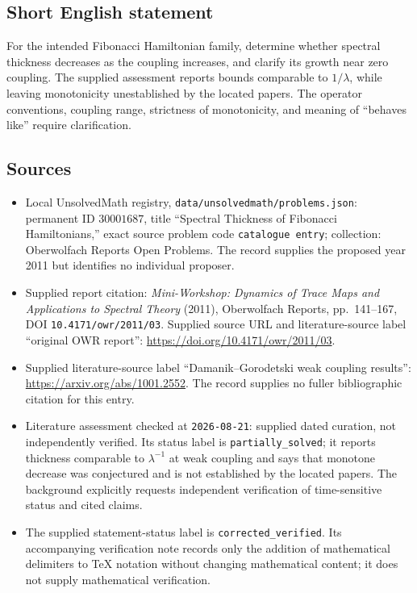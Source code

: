 \documentclass[11pt]{article}
\begin{document}
\subsection{Short English statement}
For the intended Fibonacci Hamiltonian family, determine whether spectral thickness decreases as the coupling increases, and clarify its growth near zero coupling. The supplied assessment reports bounds comparable to \(1/\lambda\), while leaving monotonicity unestablished by the located papers. The operator conventions, coupling range, strictness of monotonicity, and meaning of ``behaves like'' require clarification.
\subsection{Sources}
\begin{itemize}
\item Local UnsolvedMath registry, \texttt{data/unsolvedmath/problems.json}: permanent ID \(30001687\), title ``Spectral Thickness of Fibonacci Hamiltonians,'' exact source problem code \texttt{catalogue entry}; collection: Oberwolfach Reports Open Problems. The record supplies the proposed year 2011 but identifies no individual proposer.
\item Supplied report citation: \emph{Mini-Workshop: Dynamics of Trace Maps and Applications to Spectral Theory} (2011), Oberwolfach Reports, pp.~141--167, DOI \texttt{10.4171/owr/2011/03}. Supplied source URL and literature-source label ``original OWR report'': \url{https://doi.org/10.4171/owr/2011/03}.
\item Supplied literature-source label ``Damanik--Gorodetski weak coupling results'': \url{https://arxiv.org/abs/1001.2552}. The record supplies no fuller bibliographic citation for this entry.
\item Literature assessment checked at \texttt{2026-08-21}: supplied dated curation, not independently verified. Its status label is \texttt{partially\_solved}; it reports thickness comparable to \(\lambda^{-1}\) at weak coupling and says that monotone decrease was conjectured and is not established by the located papers. The background explicitly requests independent verification of time-sensitive status and cited claims.
\item The supplied statement-status label is \texttt{corrected\_verified}. Its accompanying verification note records only the addition of mathematical delimiters to TeX notation without changing mathematical content; it does not supply mathematical verification.
\end{itemize}
\end{document}
